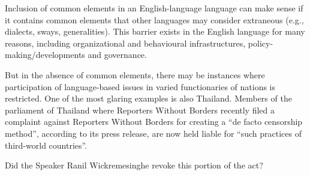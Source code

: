 \documentclass{article}
\begin{document}
Inclusion of common elements in an English-language language can make sense if it contains common elements that other languages may consider extraneous (e.g., dialects, sways, generalities). This barrier exists in the English language for many reasons, including organizational and behavioural infrastructures, policy-making/developments and governance.

But in the absence of common elements, there may be instances where participation of language-based issues in varied functionaries of nations is restricted. One of the most glaring examples is also Thailand. Members of the parliament of Thailand where Reporters Without Borders recently filed a complaint against Reporters Without Borders for creating a “de facto censorship method”, according to its press release, are now held liable for “such practices of third-world countries”.

Did the Speaker Ranil Wickremesinghe revoke this portion of the act?
\end{document}
